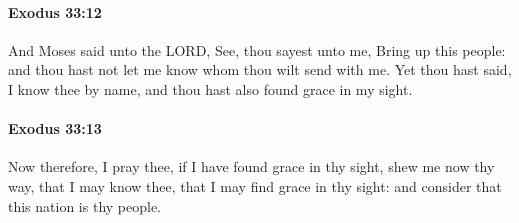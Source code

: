 		\paragraph{Exodus 33:12} %
			\label{EXODUS-33-12}

			And Moses said unto the LORD, See, thou sayest unto me, Bring up this people: and thou hast not let me know whom thou wilt send with me. Yet thou hast said, I know thee by name, and thou hast also found grace in my sight.


		\paragraph{Exodus 33:13} %
			\label{EXODUS-33-13}

			Now therefore, I pray thee, if I have found grace in thy sight, shew me now thy way, that I may know thee, that I may find grace in thy sight: and consider that this nation is thy people.

